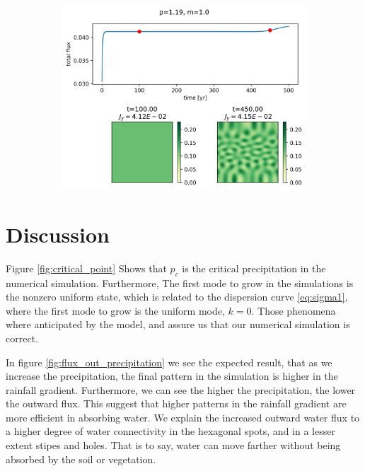 \documentclass{article}
\numberwithin{equation}{section}
\begin{document}
\begin{figure}[!ht]
    \begin{subfigure}[]{0.5\textwidth}
        \centering
        \includegraphics[scale=0.5]{plots/p1_19_m1_0.png}
        \label{fig:p1_19}
    \end{subfigure}

\end{figure}

\section{Discussion}

Figure \ref{fig:critical_point} Shows that $p_c$ is the critical precipitation in the numerical simulation.
Furthermore, The first mode to grow in the simulations is the nonzero uniform state, which is related to the dispersion curve \ref{eq:sigma1}, where the first mode to grow is the uniform mode, $k=0$.
Those phenomena where anticipated by the model, and assure us that our numerical simulation is correct.

In figure \ref{fig:flux_out_precipitation} we see the expected result, that as we increase the precipitation, the final pattern in the simulation is higher in the rainfall gradient. Furthermore, we can see the higher the precipitation, the lower the outward flux. This suggest that higher patterns in the rainfall gradient are more efficient in absorbing water.
We explain the increased outward water flux to a higher degree of water connectivity in the hexagonal spots, and in a lesser extent stipes and holes. That is to say, water can move farther without being absorbed by the soil or vegetation.
\end{document}

